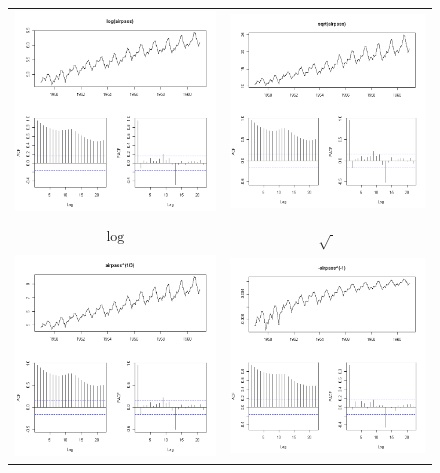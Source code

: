 \documentclass[a4paper,11pt,oneside,onecolumn]{book}
\begin{document}
\begin{figure}[!h]
\begin{center}
\begin{tabular}{cc}
\includegraphics[width=.5\linewidth]{ logairpass.png}&
\includegraphics[width=.5\linewidth]{ sqrtairpass.png}\\
 $\log$&$\sqrt{\ }$ \\
\includegraphics[width=.5\linewidth]{ rootcubeairpass.png}&
\includegraphics[width=.5\linewidth]{ invairpass.png}\\

\end{tabular}
\end{center}
\end{figure}
\end{document}
